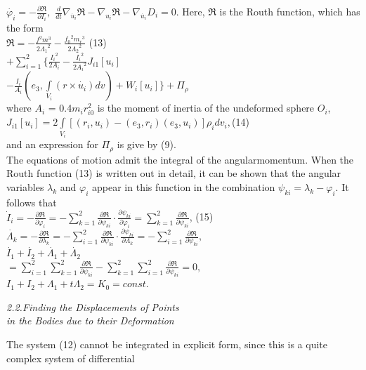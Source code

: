 \documentclass[fontsize = 11pt,a4paper]{article}
\begin{document}
\begin{multicols}{2}
$\dot{\varphi_i} = -  \frac{\partial\Re }{\partial{I_i}},$
$\frac{d}{dt} {\nabla_{\dot{u_i}}}\Re - {\nabla_{u_i}}\Re - {\nabla_{\dot{u_i}}}D_i = 0.$
Here, $\Re$ is the Routh function, which has the form\\
$\Re = - \frac{{f^2}{m^3}}{2{\Lambda_1}^2} - \frac{{f_0}^2{m_r}^3}{2{\Lambda_2}^2}$ \hfill (13)\\
$+  \sum\limits_{i=1}^{2} \{ \frac{{I_i}^2}{2A_i} -\frac{{I_i}^2}{2{A_i}^2}J_{i1}[u_i] $\\
$- \frac{I_i}{A_i}( e_3, \int\limits_{V_i} (r \times \dot{u_i}) dv) + W_i[u_i]\} + {\Pi_\rho}$\\
where $A_i$ = 0.4${m_i}{r^2_{i0}}$ is the moment of inertia of the
undeformed sphere $O_i$,\\
$J_{i1}[u_i] = 2  \int\limits_{V_i}[(r_i, u_i) - (e_3, r_i)(e_3, u_i)]\rho_idv_i,$(14)\\ 
and an expression for $\Pi_\rho$ is give by (9). \\
\indent The equations of motion admit the integral of the
angularmomentum. When the Routh function (13) is
written out in detail, it can be shown that the angular
variables $\lambda_k$ and $\varphi_i$ appear in this function in the
combination $\psi_{ki} = \lambda_k - \varphi_i$. It follows that \\
$\dot{I}_i = - \frac{\partial\Re}{\partial\varphi_i} = - \sum\limits_{k=1}^{2}\frac{\partial\Re}{\partial\psi_{ki}}\cdot
\frac{\partial\psi_{ki}}{\partial{\varphi_i}} = \sum\limits_{k=1}^{2} \frac{\partial\Re}{\partial\psi_{ki}}$, \hfill (15)\\
$\dot{\Lambda_k} = -  \frac{\partial\Re }{\partial{\lambda_k}} = - \sum\limits_{i=1}^{2} \frac{\partial\Re}{\partial\psi_{ki}} 
\cdot \frac{\partial\psi_{ki}}{\partial{\Lambda_k}} = - \sum\limits_{i=1}^{2}\frac{\partial\Re}{\partial\psi_{ki}},$\\
$\dot{I_1} + \dot{I_2} + \dot{\Lambda_1} + \dot{\Lambda_2}$\\
$ = \sum\limits_{i=1}^{2} \sum\limits_{k=1}^{2} \frac{\partial\Re}{\partial\psi_{ki}} -  \sum\limits_{k=1}^{2} \sum\limits_{i=1}^{2}
 \frac{\partial\Re}{\partial\psi_{ki}} = 0,$ \\
${I_1} + {I_2} + {\Lambda_1} + t{\Lambda_2} = K_0 = const.$\\
 \centerline{\emph{2.2.Finding the Displacements of Points\\
in the Bodies due to their Deformation}}
\indent The system (12) cannot be integrated in explicit
form, since this is a quite complex system of differential

\end{multicols}
\end{document}
